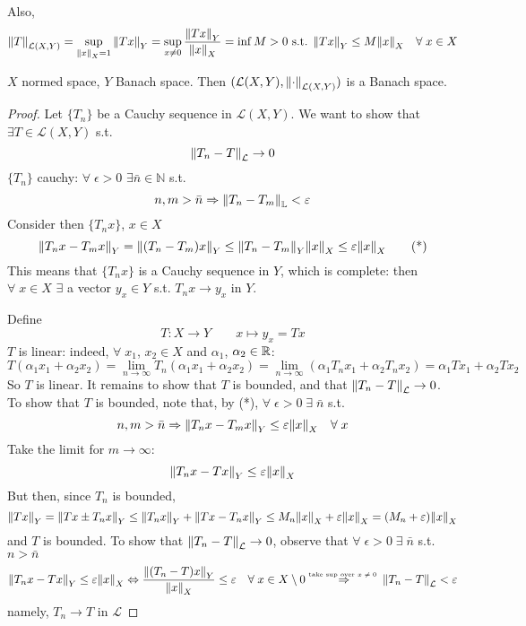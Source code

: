 Also, 
\[
    \norm{T}_{\mathcal{L}(X, Y)} = \sup_{\norm{x}_X = 1} \norm{Tx}_Y = \sup_{x \neq 0} \frac{\norm{Tx}_Y}{\norm{x}_X} = \inf{M >0 \text{ s.t. } \norm{Tx}_Y \leq M \norm{x}_X \quad \forall \; x \in X}
\]

\begin{theorem}
    \(X\) normed space, \(Y\) Banach space. Then \((\mathcal{L}(X, Y), \norm{\cdot}_{\mathcal{L}(X, Y)})\) is a Banach space.
\end{theorem}
\begin{proof}
    Let \(\{T_n\}\) be a Cauchy sequence in \(\mathcal{L}(X, Y)\). We want to show that \(\exists T \in \mathcal{L}(X, Y) \) s.t.
    \[
        \norm{T_n - T}_\mathcal{L} \to 0
    \]
    \(\{T_n\}\) cauchy: \(\forall \; \epsilon >0 \) \(\exists \bar{n} \in \mathbb{N}\) s.t. 
    \[
        n, m > \bar{n} \Rightarrow \norm{T_n - T_m }_\mathbb{L} < \varepsilon
    \]
    Consider then \(\{ T_n x \}\), \(x \in X\)
    \[
        \norm{T_n x - T_m x }_Y = \norm{(T_n - T_m)x}_Y \leq \norm{T_n - T_m}_Y \norm{x}_X \leq \varepsilon \norm{x}_X \tag{*}
    \]
    This means that \(\{ T_n x \}\) is a Cauchy sequence in \(Y\), which is complete: then \(\forall \; x \in X\) \(\exists \) a vector \(y_x \in Y\) s.t. \(T_n x \to y_x\) in \(Y\).

    Define 
    \[
        T: X \to Y \qquad x \mapsto y_x = Tx
    \]
    \(T\) is linear: indeed, \(\forall \; x_1\), \(x_2 \in X\) and \(\alpha_1\), \(\alpha_2 \in \mathbb{R}\):
    \[
        T(\alpha_1 x_1 + \alpha_2 x_2) = \lim_{n \to \infty} T_n (\alpha_1 x_1 + \alpha_2 x_2) = \lim_{n \to \infty} (\alpha_1 T_n x_1 + \alpha_2 T_n x_2) = \alpha_1 Tx_1 + \alpha_2 Tx_2
    \]
    So \(T \) is linear. It remains to show that \(T\) is bounded, and that \(\norm{T_n - T}_{\mathcal{L}} \to 0\).
    To show that \(T\) is bounded, note that, by (*), \(\forall \; \epsilon >0 \; \exists \; \bar{n}\) s.t.
    \[
        n, m > \bar{n} \Rightarrow \norm{T_n x - T_m x}_Y \leq \varepsilon \norm{x}_X \quad \forall \; x 
    \]
    Take the limit for \(m \to \infty\): 
    \[
        \norm{T_n x - Tx}_Y \leq \varepsilon \norm{x}_X
    \]
    But then, since \(T_n\) is bounded, 
    \[
        \norm{Tx}_Y = \norm{Tx \pm T_n x}_Y \leq \norm{T_n x}_Y + \norm{Tx - T_n x}_Y \leq M_n \norm{x}_X + \varepsilon \norm{x}_X = (M_n + \varepsilon) \norm{x}_X
    \]
    and \(T\) is bounded. To show that \(\norm{T_n - T}_\mathcal{L} \to 0\), observe that \(\forall \; \epsilon >0 \; \exists \; \bar{n} \) s.t. \(n > \bar{n}\)
    \[
        \norm{T_n x - Tx}_Y \leq \varepsilon \norm{x}_X 
        \Leftrightarrow \frac{\norm{(T_n - T)x}_Y}{\norm{x}_X} \leq \varepsilon \quad \forall \; x \in X \setminus {0}
        \overset{\text{\tiny{take sup over \(x \neq 0\)} }}{\Rightarrow} \norm{T_n - T}_\mathcal{L} < \varepsilon
    \]
    namely, \(T_n \to T\) in \(\mathcal{L}\)
\end{proof}